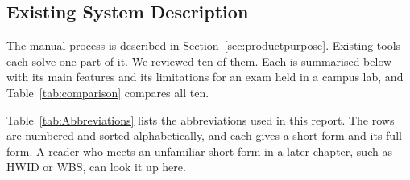 \subsection{Existing System Description}
\label{sec:existingsystems}

The manual process is described in Section~\ref{sec:productpurpose}. Existing tools each solve one part of it. We reviewed ten of them. Each is summarised below with its main features and its limitations for an exam held in a campus lab, and Table~\ref{tab:comparison} compares all ten.

Table~\ref{tab:Abbreviations} lists the abbreviations used in this report. The rows are numbered and sorted alphabetically, and each gives a short form and its full form. A reader who meets an unfamiliar short form in a later chapter, such as HWID or WBS, can look it up here.

